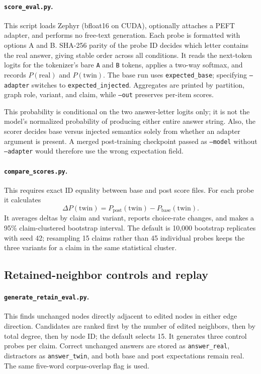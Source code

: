 \documentclass[11pt]{article}
\begin{document}
\paragraph{\texttt{score\_eval.py}.}
This script loads Zephyr (bfloat16 on CUDA), optionally attaches a PEFT adapter,
and performs no free-text generation.  Each probe is formatted with options A
and B.  SHA-256 parity of the probe ID decides which letter contains the real
answer, giving stable order across all conditions.  It reads the next-token
logits for the tokenizer's bare \texttt{A} and \texttt{B} tokens, applies a
two-way softmax, and records $P(\mathrm{real})$ and $P(\mathrm{twin})$.  The
base run uses \texttt{expected\_base}; specifying \texttt{--adapter} switches to
\texttt{expected\_injected}.  Aggregates are printed by partition, graph role,
variant, and claim, while \texttt{--out} preserves per-item scores.

This probability is conditional on the two answer-letter logits only; it is not
the model's normalized probability of producing either entire answer string.
Also, the scorer decides base versus injected semantics solely from whether an
adapter argument is present.  A merged post-training checkpoint passed as
\texttt{--model} without \texttt{--adapter} would therefore use the wrong
expectation field.

\paragraph{\texttt{compare\_scores.py}.}
This requires exact ID equality between base and post score files.  For each
probe it calculates
\[
\Delta P(\mathrm{twin}) = P_{\mathrm{post}}(\mathrm{twin})
                         - P_{\mathrm{base}}(\mathrm{twin}).
\]
It averages deltas by claim and variant, reports choice-rate changes, and makes
a 95\% claim-clustered bootstrap interval.  The default is 10,000 bootstrap
replicates with seed 42; resampling 15 claims rather than 45 individual probes
keeps the three variants for a claim in the same statistical cluster.

\subsection{Retained-neighbor controls and replay}

\paragraph{\texttt{generate\_retain\_eval.py}.}
This finds unchanged nodes directly adjacent to edited nodes in either edge
direction.  Candidates are ranked first by the number of edited neighbors, then
by total degree, then by node ID; the default selects 15.  It generates three
control probes per claim.  Correct unchanged answers are stored as
\texttt{answer\_real}, distractors as \texttt{answer\_twin}, and both base and
post expectations remain real.  The same five-word corpus-overlap flag is used.
\end{document}
